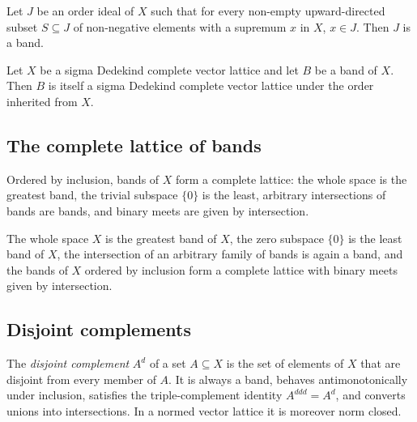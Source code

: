 \begin{lemma}
\label{lem:band-ofPosDirectedSSupMem}
\leanok
{}
Let $J$ be an order ideal of $X$ such that for every non-empty
upward-directed subset $S \subseteq J$ of non-negative elements with a
supremum $x$ in $X$, $x \in J$. Then $J$ is a band.
\end{lemma}

\begin{lemma}
\label{lem:band-instConditionallyCompleteLatticeSubtype}
\leanok
{}
Let $X$ be a sigma Dedekind complete vector lattice and let $B$ be a
band of $X$. Then $B$ is itself a sigma Dedekind complete vector
lattice under the order inherited from $X$.
\end{lemma}

\subsection{The complete lattice of bands}

Ordered by inclusion, bands of $X$ form a complete lattice: the whole
space is the greatest band, the trivial subspace $\{0\}$ is the least,
arbitrary intersections of bands are bands, and binary meets are given
by intersection.

\begin{lemma}
\label{lem:band-complete-lattice}
\leanok
{}
The whole space $X$ is the greatest band of $X$, the zero subspace
$\{0\}$ is the least band of $X$, the intersection of an arbitrary
family of bands is again a band, and the bands of $X$ ordered by
inclusion form a complete lattice with binary meets given by
intersection.
\end{lemma}

\subsection{Disjoint complements}

The \emph{disjoint complement} $A^d$ of a set $A \subseteq X$ is the
set of elements of $X$ that are disjoint from every member of $A$. It
is always a band, behaves antimonotonically under inclusion, satisfies
the triple-complement identity $A^{ddd} = A^d$, and converts unions
into intersections. In a normed vector lattice it is moreover norm
closed.

